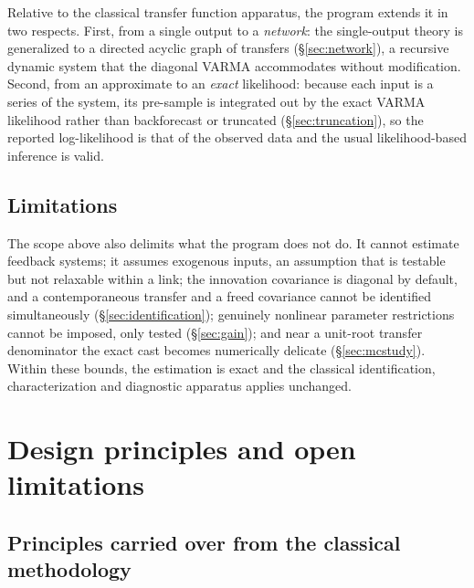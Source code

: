 \documentclass[11pt,a4paper]{article}
\theoremstyle{plain}
\theoremstyle{remark}
\begin{document}
Relative to the classical transfer function apparatus, the program extends it in two
respects. First, from a single output to a \emph{network}: the single-output theory
\cite{bjr1994,liu1982} is generalized to a directed acyclic graph of transfers
(\S\ref{sec:network}), a recursive dynamic system that the diagonal VARMA
accommodates without modification. Second, from an approximate to an \emph{exact}
likelihood: because each input is a series of the system, its pre-sample is
integrated out by the exact VARMA likelihood rather than backforecast or truncated
(\S\ref{sec:truncation}), so the reported log-likelihood is that of the observed
data and the usual likelihood-based inference is valid.

\subsection{Limitations}

The scope above also delimits what the program does not do. It cannot estimate
feedback systems; it assumes exogenous inputs, an assumption that is testable but not
relaxable within a link; the innovation covariance is diagonal by default, and a
contemporaneous transfer and a freed covariance cannot be identified simultaneously
(\S\ref{sec:identification}); genuinely nonlinear parameter restrictions cannot be
imposed, only tested (\S\ref{sec:gain}); and near a unit-root transfer denominator the
exact cast becomes numerically delicate (\S\ref{sec:mcstudy}). Within these bounds,
the estimation is exact and the classical identification, characterization and
diagnostic apparatus applies unchanged.

\section{Design principles and open limitations}
\label{sec:todo}

\subsection{Principles carried over from the classical methodology}
\end{document}
